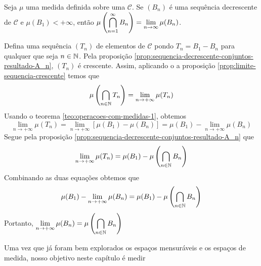 \begin{proposition}
Seja $\mu$ uma medida definida sobre uma \sigal $\mathcal{C}$.
Se $(B_n)$ é uma sequência decrescente de $\mathcal{C}$ e $\mu(B_1) < +\infty$, então 
$\mu\left(\displaystyle \bigcap_{n = 1}^\infty B_n\right) = \displaystyle \lim_{n \to \infty} \mu(B_n)$.
\end{proposition} 
\begin{prova}
    Defina uma sequência $(T_n)$ de elementos de $\mathcal{C}$ pondo $T_n = B_1 - B_n$ para qualquer que seja $n \in \operatorname{\mathbb{N}}$.
    Pela proposição \ref{prop:sequencia-decrescente-conjuntos-resultado-A_n}, $(T_n)$ é crescente.
    Assim, aplicando o a proposição \ref{prop:limite-sequencia-crescente} temos que 
    $$
    \mu\left(\bigcap_{n \in \operatorname{\mathbb{N}}} T_n\right) = \lim_{n \to +\infty} \mu(T_n)
    $$
    Usando o teorema \ref{teo:operacoes-com-medidas-1}, obtemos
    $$
    \lim_{n \to +\infty} \mu(T_n) = \lim_{n \to +\infty} [\mu(B_1) - \mu(B_n)] = \mu(B_1) - \lim_{n \to +\infty} \mu(B_n)
    $$
    Segue pela proposição \ref{prop:sequencia-decrescente-conjuntos-resultado-A_n} que 
    $$
    \lim_{n \to +\infty} \mu(T_n) = \mu(B_1) - \mu\left(\bigcap_{n \in \operatorname{\mathbb{N}}} B_n\right)
    $$
    Combinando as duas equações obtemos que
    \begin{align*}
        \mu(B_1) - \lim_{n \to +\infty} \mu(B_n) = \mu(B_1) - \mu\left(\bigcap_{n \in \operatorname{\mathbb{N}}} B_n\right)
    \end{align*}
    Portanto, $\displaystyle \lim_{n \to +\infty} \mu(B_n) = \mu\left(\bigcap_{n \in \operatorname{\mathbb{N}}} B_n\right)$
\end{prova}




Uma vez que já foram bem explorados os espaços mensuráveis e os espaços de medida, nosso objetivo neste capítulo é medir 
